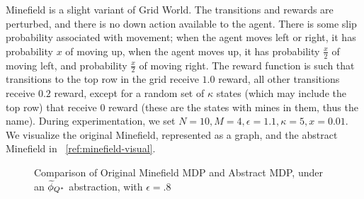 Minefield is a slight variant of Grid World. The transitions and rewards are perturbed, and there is no down action available to the agent. There is some slip probability associated with movement; when the agent moves left or right, it has probability $x$ of moving up, when the agent moves up, it has probability $\frac{x}{2}$ of moving left, and probability $\frac{x}{2}$ of moving right. The reward function is such that transitions to the top row in the grid receive $1.0$ reward, all other transitions receive $0.2$ reward, except for a random set of $\kappa$ states (which may include the top row) that receive $0$ reward (these are the states with mines in them, thus the name). During experimentation, we set $N=10, M=4, \epsilon=1.1, \kappa = 5, x = 0.01$. We visualize the original Minefield, represented as a graph, and the abstract Minefield in ~\ref{ref:minefield-visual}.

\begin{figure}
\label{fig:minefield-visual}
\caption{Comparison of Original Minefield MDP and Abstract MDP, under an $\widetilde \phi_{Q^*}$ abstraction, with $\epsilon=.8$}
\end{figure} 


